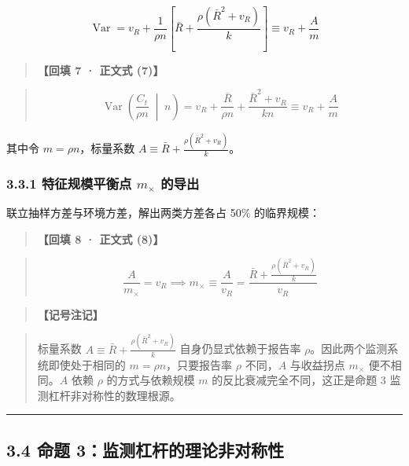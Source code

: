 \documentclass[11pt,a4paper]{ctexart}
\begin{document}
\[
\operatorname{Var} = v_R + \frac{1}{\rho n}\left[ \bar{R} + \frac{\rho(\bar{R}^2 + v_R)}{k} \right] \equiv v_R + \frac{A}{m}
\]

\begin{quote}\small\color{black!75}
\textbf{【回填 7 · 正文式 (7)】}
\end{quote}
\begin{quote}\small\color{black!75}
\begin{equation*}
\operatorname{Var}\left(\frac{C_t}{\rho n} \;\middle|\; n\right) = v_R + \frac{\bar{R}}{\rho n} + \frac{\bar{R}^2 + v_R}{kn} \equiv v_R + \frac{A}{m} \tag{eq:var\_prop2}
\end{equation*}
\end{quote}

其中令 $m = \rho n$，标量系数 $A \equiv \bar{R} + \frac{\rho(\bar{R}^2 + v_R)}{k}$。


\subsubsection{3.3.1 特征规模平衡点 $m_\times$ 的导出}
联立抽样方差与环境方差，解出两类方差各占 50\% 的临界规模：


\begin{quote}\small\color{black!75}
\textbf{【回填 8 · 正文式 (8)】}
\end{quote}
\begin{quote}\small\color{black!75}
\begin{equation*}
\frac{A}{m_\times} = v_R \implies m_\times \equiv \frac{A}{v_R} = \frac{\bar{R} + \frac{\rho(\bar{R}^2 + v_R)}{k}}{v_R} \tag{eq:crossover\_def}
\end{equation*}
\end{quote}

\begin{quote}\small\color{black!75}
\textbf{【记号注记】}
\end{quote}
\begin{quote}\small\color{black!75}
标量系数 $A \equiv \bar{R} + \frac{\rho(\bar{R}^2 + v_R)}{k}$ 自身仍显式依赖于报告率 $\rho$。因此两个监测系统即使处于相同的 $m = \rho n$，只要报告率 $\rho$ 不同，$A$ 与收益拐点 $m_\times$ 便不相同。$A$ 依赖 $\rho$ 的方式与依赖规模 $m$ 的反比衰减完全不同，这正是命题 3 监测杠杆非对称性的数理根源。
\end{quote}

\vspace{0.8em}\hrule\vspace{0.8em}

\subsection{3.4 命题 3：监测杠杆的理论非对称性}
\end{document}
